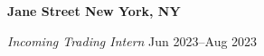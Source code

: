 \textbf{Jane Street \hfill New York, NY}\par

\textit{Incoming Trading Intern} \hfill Jun 2023--Aug 2023
